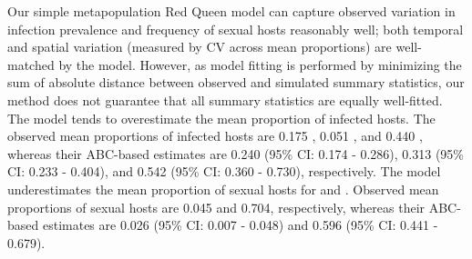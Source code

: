 \documentclass{article}\usepackage[]{graphicx}\usepackage[]{color}
\begin{document}
Our simple metapopulation Red Queen model can capture observed variation in infection prevalence and frequency of sexual hosts reasonably well;
both temporal and spatial variation (measured by CV across mean proportions) are well-matched by the model. 
However, as model fitting is performed by minimizing the sum of absolute distance between observed and simulated summary statistics, our method does not guarantee that all summary statistics are equally well-fitted.
The model tends to overestimate the mean proportion of infected hosts.
The observed mean proportions of infected hosts are 0.175 \citep{dagan2013clonal}, 0.051 \citep{mckone2016fine}, and 0.440 \citep{vergara2014infection}, 
whereas their ABC-based estimates are 0.240 (95\% CI: 0.174 - 0.286), 0.313 (95\% CI: 0.233 - 0.404), and 0.542 (95\% CI: 0.360 - 0.730), respectively.
The model underestimates the mean proportion of sexual hosts for \cite{dagan2013clonal} and \cite{vergara2014infection}.
Observed mean proportions of sexual hosts are 0.045 and 0.704, respectively, whereas their ABC-based estimates are 0.026 (95\% CI: 0.007 - 0.048) and 0.596 (95\% CI: 0.441 - 0.679).
\end{document}
